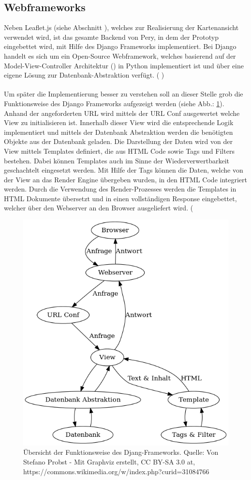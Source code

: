 \documentclass[Bachelorarbeit.tex]{subfiles}
\begin{document}
\subsection*{Webframeworks}
Neben Leaflet.js (siehe Abschnitt ), welches zur Realisierung der Kartenansicht verwendet wird, ist das gesamte Backend von Pery, in dem der Prototyp eingebettet wird, mit Hilfe des Django Frameworks implementiert. 
Bei Django handelt es sich um ein Open-Source Webframework, welches basierend auf der Model-View-Controller Architektur (\cite[vgl.][]{DjangoMVC}) in Python implementiert ist und über eine eigene Lösung zur Datenbank-Abstraktion verfügt. (\cite[vgl.][]{DjangoDoc} \cite[sowie][- sekundär Quelle]{DjangoStackoverflow})\\
\\
Um später die Implementierung besser zu verstehen soll an dieser Stelle grob die Funktionsweise des Django Frameworks aufgezeigt werden (siehe Abb.: \ref{fig:MTV_Django}).
Anhand der angeforderten \ac{URL} wird mittels der \ac{URL Conf} ausgewertet welche View zu initialisieren ist.
Innerhalb dieser View wird die entsprechende Logik implementiert und mittels
der Datenbank Abstraktion werden die benötigten Objekte aus der Datenbank geladen.
Die Darstellung der Daten wird von der View mittels Templates definiert, die  aus \ac{HTML} Code sowie Tags und Filters bestehen. 
Dabei können Templates auch im Sinne der Wiederverwertbarkeit geschachtelt eingesetzt werden. 
Mit Hilfe der Tags können die Daten, welche von der View an das Render Engine übergeben wurden, in den \ac{HTML} Code integriert werden.
Durch die Verwendung des Render-Prozesses werden die Templates in \ac{HTML} Dokumente übersetzt und in einen vollständigen Response eingebettet, welcher über den Webserver an den Browser ausgeliefert wird. (\cite[vgl.][]{DjangoDoc}

\begin{figure}[H]
\centering
\includegraphics[width=0.7\linewidth]{img/Implementierung/MTV_Django}
\caption[k]{Übersicht der Funktionsweise des Djang-Frameworks. Quelle: Von Stefano Probst - Mit Graphviz erstellt, CC BY-SA 3.0 at, https://commons.wikimedia.org/w/index.php?curid=31084766}
\label{fig:MTV_Django}
\end{figure}
\end{document}
